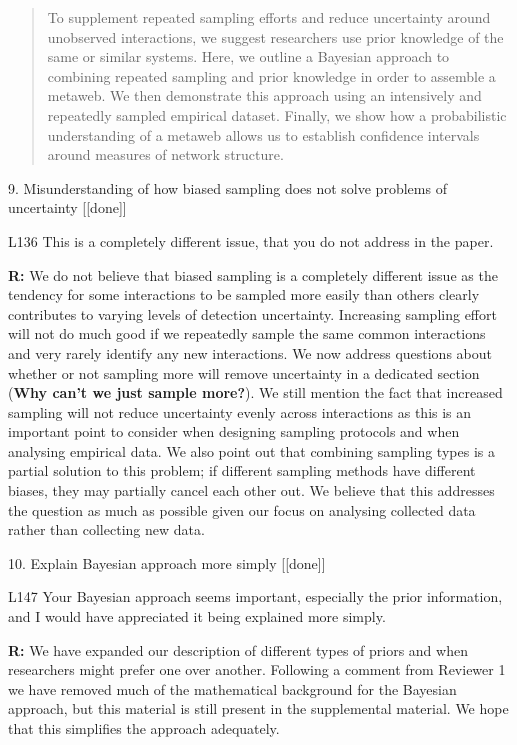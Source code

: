 \documentclass[12pt]{letter}
\newenvironment{refquote}{\bigskip \begin{it}}{\end{it}\smallskip}
\begin{document}
\begin{itemize}
		\begin{quotation}
			To supplement repeated sampling efforts and reduce uncertainty around unobserved interactions, we suggest researchers use prior knowledge of the same or similar systems. Here, we outline a Bayesian approach to combining repeated sampling and prior knowledge in order to assemble a metaweb. We then demonstrate this approach using an intensively and repeatedly sampled empirical dataset. Finally, we show how a probabilistic understanding of a metaweb allows us to establish confidence intervals around measures of network structure.
			\end{quotation}


	9. Misunderstanding of how biased sampling does not solve problems of uncertainty [[done]]

		\begin{refquote}
		L136 This is a completely different issue, that you do not address in the paper.
		\end{refquote}

		\textbf{R:} We do not believe that biased sampling is a completely different issue as the tendency for some interactions to be sampled more easily than others clearly contributes to varying levels of detection uncertainty. Increasing sampling effort will not do much good if we repeatedly sample the same common interactions and very rarely identify any new interactions. We now address questions about whether or not sampling more will remove uncertainty in a dedicated section (\textbf{Why can't we just sample more?}). We still mention the fact that increased sampling will not reduce uncertainty evenly across interactions as this is an important point to consider when designing sampling protocols and when analysing empirical data. We also point out that combining sampling types is a partial solution to this problem; if different sampling methods have different biases, they may partially cancel each other out. We believe that this addresses the question as much as possible given our focus on analysing collected data rather than collecting new data.


	10. Explain Bayesian approach more simply [[done]]

		\begin{refquote}
		L147 Your Bayesian approach seems important, especially the prior information, and I would have appreciated it being explained more simply.
		\end{refquote}

		\textbf{R:} We have expanded our description of different types of priors and when researchers might prefer one over another. Following a comment from Reviewer 1 we have removed much of the mathematical background for the Bayesian approach, but this material is still present in the supplemental material. We hope that this simplifies the approach adequately.



\end{itemize}
\end{document}
